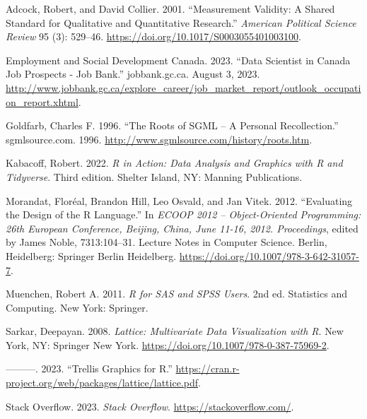\documentclass[
  letterpaper,
]{scrbook}
\newlength{\cslhangindent}
\newlength{\cslentryspacingunit} %
\newenvironment{CSLReferences}[2] %
 {%
  \setlength{\parindent}{0pt}
  \ifodd #1
  \let\oldpar\par
  \def\par{\hangindent=\cslhangindent\oldpar}
  \fi
  \setlength{\parskip}{#2\cslentryspacingunit}
 }%
 {}
\begin{document}
\hypertarget{refs}{}
\begin{CSLReferences}{1}{0}
\leavevmode{}%
Adcock, Robert, and David Collier. 2001. {``Measurement {Validity}: {A
Shared Standard} for {Qualitative} and {Quantitative Research}.''}
\emph{American Political Science Review} 95 (3): 529--46.
\url{https://doi.org/10.1017/S0003055401003100}.

\leavevmode{}%
Employment and Social Development Canada. 2023. {``Data {Scientist} in
{Canada} \textbar{} {Job} Prospects - {Job Bank}.''} {jobbank.gc.ca}.
August 3, 2023.
\url{http://www.jobbank.gc.ca/explore_career/job_market_report/outlook_occupation_report.xhtml}.

\leavevmode{}%
Goldfarb, Charles F. 1996. {``The {Roots} of {SGML} -- {A Personal
Recollection}.''} {sgmlsource.com}. 1996.
\url{http://www.sgmlsource.com/history/roots.htm}.

\leavevmode{}%
Kabacoff, Robert. 2022. \emph{R in Action: Data Analysis and Graphics
with {R} and {Tidyverse}}. Third edition. {Shelter Island, NY}: {Manning
Publications}.

\leavevmode{}%
Morandat, Floréal, Brandon Hill, Leo Osvald, and Jan Vitek. 2012.
{``Evaluating the {Design} of the {R Language}.''} In \emph{{ECOOP} 2012
-- {Object-Oriented Programming}: 26th {European Conference}, {Beijing},
{China}, {June} 11-16, 2012. {Proceedings}}, edited by James Noble,
7313:104--31. Lecture {Notes} in {Computer Science}. {Berlin,
Heidelberg}: {Springer Berlin Heidelberg}.
\url{https://doi.org/10.1007/978-3-642-31057-7}.

\leavevmode{}%
Muenchen, Robert A. 2011. \emph{R for {SAS} and {SPSS} Users}. 2nd ed.
Statistics and Computing. {New York}: {Springer}.

\leavevmode{}%
Sarkar, Deepayan. 2008. \emph{Lattice: {Multivariate Data Visualization}
with {R}}. {New York, NY}: {Springer New York}.
\url{https://doi.org/10.1007/978-0-387-75969-2}.

\leavevmode{}%
---------. 2023. {``Trellis {Graphics} for {R}.''}
\url{https://cran.r-project.org/web/packages/lattice/lattice.pdf}.

\leavevmode{}%
Stack Overflow. 2023. \emph{Stack {Overflow}}.
\url{https://stackoverflow.com/}.


\end{CSLReferences}
\end{document}
